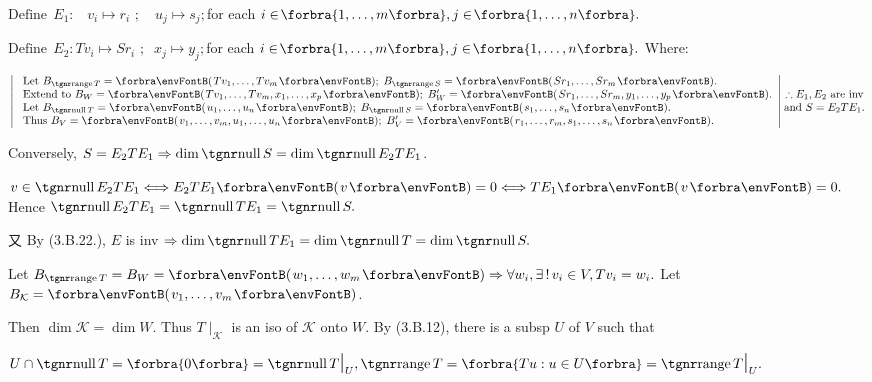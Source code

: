 \documentclass[a4paper, 11pt, UTF8]{article}
\begin{document}
\begin{large}
\par\quad
$\text{Define}\;\,E_1:\,\,\,\,\, v_i\mapsto r_i\,\,;\quad u_j\mapsto s_j;$\quad for each $i\in\!\Bra{1,\dots,m},j\in\!\Bra{1,\dots,n}.$\par\quad
$\text{Define}\;\,E_2:Tv_i\mapsto Sr_i\,\,;\;\;x_j\mapsto y_j;$\quad for each $i\in\!\Bra{1,\dots,m},j\in\!\Bra{1,\dots,n}.$
Where:\par\vspace{6pt}\quad
$\MathLeftrightMid{l}{$
	Let $B_{\range T}=\Par{Tv_1,\dots,Tv_m};\;B_{\range S}=\Par{Sr_1,\dots,Sr_m}.\\ $
	Extend to $B_W=\Par{Tv_1,\dots,Tv_m,x_1,\dots,x_p};\;B_W'=\Par{Sr_1,\dots,Sr_m,y_1,\dots,y_p}.\\ $
	Let $B_{\null T}=\Par{u_1,\dots,u_n};\;B_{\null S}=\Par{s_1,\dots,s_n}.\\ $
	Thus $B_V=\Par{v_1,\dots,v_m,u_1,\dots,u_n};\;B_V'=\Par{r_1,\dots,r_m,s_1,\dots,s_n}.}\hMath{c}{}{}{\therefore E_1,E_2$ are inv$ \\ $and $S=E_2 TE_1.}$\par\vspace{6pt}\quad
Conversely, \;$S=E_2 TE_1\Rightarrow\dim\null S=\dim\null E_2 TE_1$.\par\quad
$v\in\null E_2 TE_1\Longleftrightarrow E_2 TE_1\Par{v}=0\Longleftrightarrow TE_1\Par{v}=0.$ Hence $\null E_2 TE_1=\null TE_1=\null S.$\par\quad
又 By (3.B.22.\COROLLARY), $E$ is inv $\Rightarrow\dim\null TE_1=\dim\null T=\dim\null S.$\PfEnd
\SepLine

\par\quad
Let $B_{\range T}=B_W=\Par{w_1,\dots,w_m}\Rightarrow\forall w_i,\exists\,!\,v_i\in V,Tv_i=w_i.$ Let $B_{\mathcal{K}}=\Par{v_1,\dots,v_m}$.\par\quad
Then $\dim\mathcal{K}=\dim W.$ Thus $T\mid_{\mathcal{K}}$ is an iso of ${\mathcal{K}}$ onto $W.$\PfEnd\vspace{6pt}\quad
\Or By (3.B.12), there is a subsp $U$ of $V$ such that\par\quad
$U\cap \null T=\zeroSubs=\null T\mid_U,\range T=\Bra{Tu:u\in U}=\range T\mid_U.$\PfEnd
\SepLine
\pagebreak


\end{large}
\end{document}
